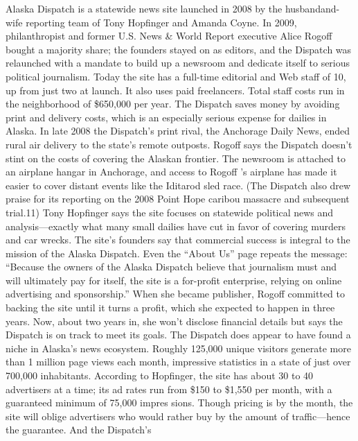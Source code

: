 Alaska Dispatch is a statewide news site launched in 2008 by the husbandand-
wife reporting team of Tony Hopfinger and Amanda Coyne. In 2009,
philanthropist and former U.S. News & World Report executive Alice Rogoff
bought a majority share; the founders stayed on as editors, and the Dispatch
was relaunched with a mandate to build up a newsroom and dedicate itself to
serious political journalism.
Today the site has a full-time editorial and Web staff of 10, up from just two
at launch. It also uses paid freelancers. Total staff costs run in the neighborhood
of \$650,000 per year. The Dispatch saves money by avoiding print and delivery
costs, which is an especially serious expense for dailies in Alaska. In late 2008 the
Dispatch’s print rival, the Anchorage Daily News, ended rural air delivery to the
state’s remote outposts.
Rogoff says the Dispatch doesn’t stint on the costs of covering the Alaskan
frontier. The newsroom is attached to an airplane hangar in Anchorage, and access
to Rogoff ’s airplane has made it easier to cover distant events like the Iditarod
sled race. (The Dispatch also drew praise for its reporting on the 2008
Point Hope caribou massacre and subsequent trial.11) Tony Hopfinger says the
site focuses on statewide political news and analysis—exactly what many small
dailies have cut in favor of covering murders and car wrecks.
The site’s founders say that commercial success is integral to the mission of the
Alaska Dispatch. Even the ``About Us'' page repeats the message: ``Because the
owners of the Alaska Dispatch believe that journalism must and will ultimately
pay for itself, the site is a for-profit enterprise, relying on online advertising and
sponsorship.'' When she became publisher, Rogoff committed to backing the site
until it turns a profit, which she expected to happen in three years. Now, about
two years in, she won’t disclose financial details but says the Dispatch is on track
to meet its goals.
The Dispatch does appear to have found a niche in Alaska’s news ecosystem.
Roughly 125,000 unique visitors generate more than 1 million page views each
month, impressive statistics in a state of just over 700,000 inhabitants. According
to Hopfinger, the site has about 30 to 40 advertisers at a time; its ad rates run
from \$150 to \$1,550 per month, with a guaranteed minimum of 75,000 impres
sions. Though pricing is by the month, the site will oblige advertisers who would
rather buy by the amount of traffic—hence the guarantee. And the Dispatch’s
